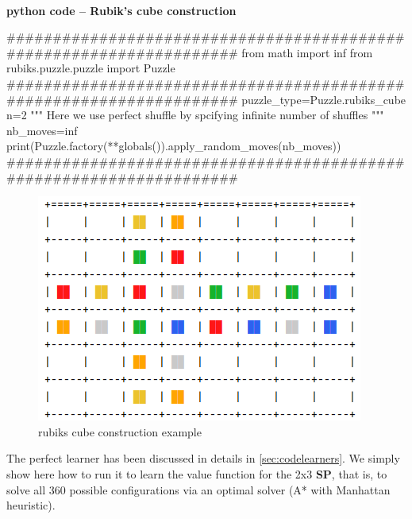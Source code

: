 \paragraph{}{\textbf{python code -- Rubik's cube construction}}
\begin{python}
####################################################################
from math import inf
from rubiks.puzzle.puzzle import Puzzle
####################################################################
puzzle_type=Puzzle.rubiks_cube
n=2
""" Here we use perfect shuffle by spcifying infinite number of shuffles """
nb_moves=inf
print(Puzzle.factory(**globals()).apply_random_moves(nb_moves))
####################################################################
\end{python}
\black

\begin{figure}[H]
\centering
\includegraphics[scale=0.8]{./Figures/examplercconstruction}
\caption[Examples]{rubiks cube construction example}
\label{fig:examplercconstruction}
\end{figure}




\label{PLSS}

The perfect learner has been discussed in details in \ref{sec:codelearners}. We simply show here how to run it to learn the value function for the 2x3 \textbf{SP}, that is, to solve all 360 possible configurations via an optimal solver (A{*} with Manhattan heuristic).


\afblue

